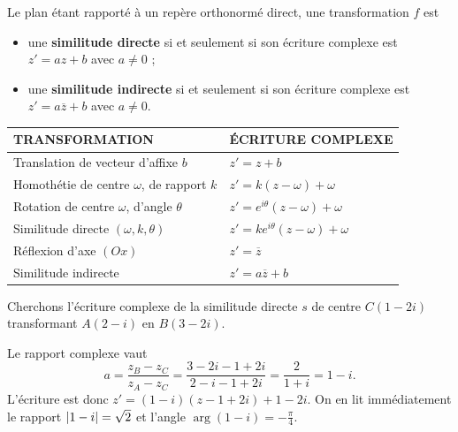\begin{theoreme}
Le plan étant rapporté à un repère orthonormé direct, une transformation $f$
est
\begin{itemize}[leftmargin=*, itemsep=0.1em]
  \item une \textbf{similitude directe} si et seulement si son écriture
        complexe est $z' = az+b$ avec $a \neq 0$ ;
  \item une \textbf{similitude indirecte} si et seulement si son écriture
        complexe est $z' = a\overline z+b$ avec $a \neq 0$.
\end{itemize}
\end{theoreme}

\begin{propriete}
\begin{center}
\setlength{\tabcolsep}{9pt}
\renewcommand{\arraystretch}{1.3}
\begin{tabular}{@{}ll@{}}
\toprule
\textsf{\footnotesize\bfseries TRANSFORMATION} &
\textsf{\footnotesize\bfseries ÉCRITURE COMPLEXE} \\
\midrule
Translation de vecteur d'affixe $b$ & $z' = z+b$ \\
Homothétie de centre $\omega$, de rapport $k$ &
  $z' = k(z-\omega)+\omega$ \\
Rotation de centre $\omega$, d'angle $\theta$ &
  $z' = e^{i\theta}(z-\omega)+\omega$ \\
Similitude directe $(\omega,k,\theta)$ &
  $z' = ke^{i\theta}(z-\omega)+\omega$ \\
Réflexion d'axe $(Ox)$ & $z' = \overline z$ \\
Similitude indirecte & $z' = a\overline z+b$ \\
\bottomrule
\end{tabular}
\end{center}
\end{propriete}

\begin{exemple}
Cherchons l'écriture complexe de la similitude directe $s$ de centre
$C(1-2i)$ transformant $A(2-i)$ en $B(3-2i)$.

Le rapport complexe vaut
\[
  a = \frac{z_{B}-z_{C}}{z_{A}-z_{C}}
    = \frac{3-2i-1+2i}{2-i-1+2i}
    = \frac{2}{1+i}
    = 1-i .
\]
L'écriture est donc $z' = (1-i)\left(z-1+2i\right)+1-2i$. On en lit
immédiatement le rapport $\left|1-i\right| = \sqrt2$ et l'angle
$\arg(1-i) = -\frac{\pi}{4}$.
\end{exemple}

